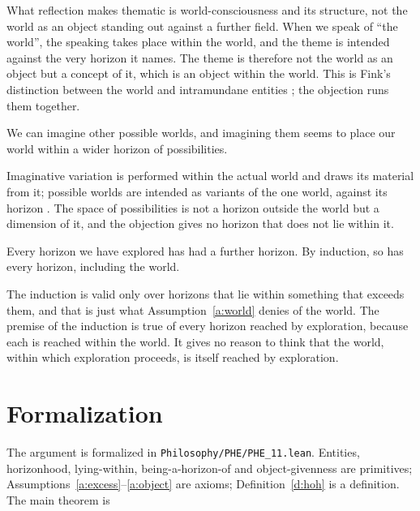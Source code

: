 \documentclass{situationist-preprint}
\begin{document}
\begin{reply}
What reflection makes thematic is world-consciousness and its structure, not the world as an object standing out against a further field. When we speak of \enquote{the world}, the speaking takes place within the world, and the theme is intended against the very horizon it names. The theme is therefore not the world as an object but a concept of it, which is an object within the world. This is Fink's distinction between the world and intramundane entities \citep{Fink1958}; the objection runs them together.
\end{reply}

\begin{objection}
We can imagine other possible worlds, and imagining them seems to place our world within a wider horizon of possibilities.
\end{objection}

\begin{reply}
Imaginative variation is performed within the actual world and draws its material from it; possible worlds are intended as variants of the one world, against its horizon \citep[§87]{Husserl1939}. The space of possibilities is not a horizon outside the world but a dimension of it, and the objection gives no horizon that does not lie within it.
\end{reply}

\begin{objection}
Every horizon we have explored has had a further horizon. By induction, so has every horizon, including the world.
\end{objection}

\begin{reply}
The induction is valid only over horizons that lie within something that exceeds them, and that is just what Assumption~\ref{a:world} denies of the world. The premise of the induction is true of every horizon reached by exploration, because each is reached within the world. It gives no reason to think that the world, within which exploration proceeds, is itself reached by exploration.
\end{reply}

\section{Formalization}

The argument is formalized in \nolinkurl{Philosophy/PHE/PHE_11.lean}. Entities, horizonhood, lying-within, being-a-horizon-of and object-givenness are primitives; Assumptions~\ref{a:excess}--\ref{a:object} are axioms; Definition~\ref{d:hoh} is a definition. The main theorem is
\end{document}
